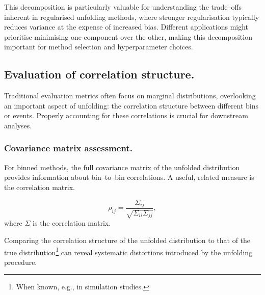         This decomposition is particularly valuable for understanding the trade--offs inherent in regularised unfolding methods, where stronger regularisation typically reduces variance at the expense of increased bias.
        Different applications might prioritise minimising one component over the other, making this decomposition important for method selection and hyperparameter choices.

    \subsection{Evaluation of correlation structure.}
        Traditional evaluation metrics often focus on marginal distributions, overlooking an important aspect of unfolding: the correlation structure between different bins or events.
        Properly accounting for these correlations is crucial for downstream analyses.
        \subsubsection{Covariance matrix assessment.}
            For binned methods, the full covariance matrix of the unfolded distribution provides information about bin--to--bin correlations.
            A useful, related measure is the correlation matrix.
            \begin{definition}
                \begin{equation}
                    \rho_{ij} = \frac{\Sigma_{ij}}{\sqrt{\Sigma_{ii}\Sigma_{jj}}},
                \end{equation}
                where \(\Sigma\) is the correlation matrix.
            \end{definition}

            Comparing the correlation structure of the unfolded distribution to that of the true distribution\footnote{When known, e.g., in simulation studies.} can reveal systematic distortions introduced by the unfolding procedure.

